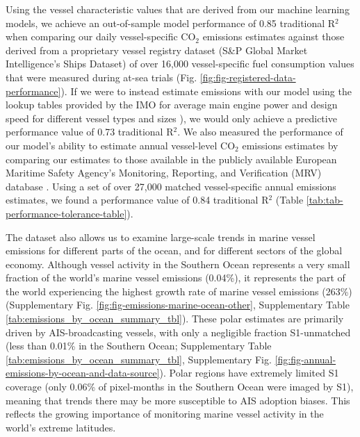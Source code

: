 \documentclass[lineno,pdflatex,sn-nature]{sn-jnl}
\begin{document}
Using the vessel characteristic values that are derived from our machine learning models, we achieve an out-of-sample model performance of 0.85 traditional R$^{2}$ when comparing our daily vessel-specific CO$_{2}$ emissions estimates against those derived from a proprietary vessel registry dataset (S\&P Global Market Intelligence's Ships Dataset) of over 16,000 vessel-specific fuel consumption values that were measured during at-sea trials (Fig. \ref{fig:fig-registered-data-performance}). If we were to instead estimate emissions with our model using the lookup tables provided by the IMO for average main engine power and design speed for different vessel types and sizes \cite{fourth2020greenhouse}), we would only achieve a predictive performance value of 0.73 traditional R$^{2}$. We also measured the performance of our model's ability to estimate annual vessel-level CO$_{2}$ emissions estimates by comparing our estimates to those available in the publicly available European Maritime Safety Agency’s Monitoring, Reporting, and Verification (MRV) database \cite{mrv_emissions}. Using a set of over 27,000 matched vessel-specific annual emissions estimates, we found a performance value of 0.84 traditional R$^{2}$ (Table \ref{tab:tab-performance-tolerance-table}).

The dataset also allows us to examine large-scale trends in marine vessel emissions for different parts of the ocean, and for different sectors of the global economy. Although vessel activity in the Southern Ocean represents a very small fraction of the world's marine vessel emissions (0.04\%), it represents the part of the world experiencing the highest growth rate of marine vessel emissions (263\%) (Supplementary Fig. \ref{fig:fig-emissions-marine-ocean-other}, Supplementary Table \ref{tab:emissions_by_ocean_summary_tbl}). These polar estimates are primarily driven by AIS-broadcasting vessels, with only a negligible fraction S1-unmatched (less than 0.01\% in the Southern Ocean; Supplementary Table \ref{tab:emissions_by_ocean_summary_tbl}, Supplementary Fig. \ref{fig:fig-annual-emissions-by-ocean-and-data-source}). Polar regions have extremely limited S1 coverage (only 0.06\%  of pixel-months in the Southern Ocean were imaged by S1), meaning that trends there may be more susceptible to AIS adoption biases. This reflects the growing importance of monitoring marine vessel activity in the world's extreme latitudes. 
\end{document}
